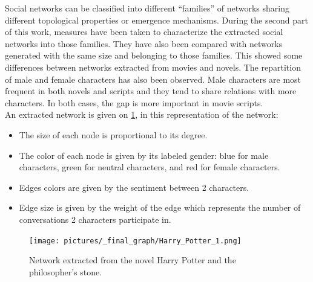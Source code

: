 \documentclass[a4paper, 12pt]{report}
\begin{document}
Social networks can be classified into different ``families'' of networks sharing different topological properties or emergence mechanisms. During the second part of this work, measures have been taken to characterize the extracted social networks into those families. They have also been compared with networks generated with the same size and belonging to those families. This showed some differences between networks extracted from movies and novels. The repartition of male and female characters has also been observed. Male characters are most frequent in both novels and scripts and they tend to share relations with more characters. In both cases, the gap is more important in movie scripts.\\





An extracted network is given on \ref{sn_harry}, in this representation of the network:
\begin{itemize}
\item The size of each node is proportional to its degree.
\item The color of each node is given by its labeled gender: blue for male characters, green for neutral characters, and red for female characters.
\item Edges colors are given by the sentiment between 2 characters.
\item Edge size is given by the weight of the edge which represents the number of conversations 2 characters participate in.
\end{itemize}


\begin{figure}[h]
\centering
\texttt{[image: pictures/\_final\_graph/Harry\_Potter\_1.png]}
\caption[foo bar]{
Network extracted from the novel Harry Potter and the philosopher's stone.
}
\label{sn_harry}
\end{figure}



\end{document}
